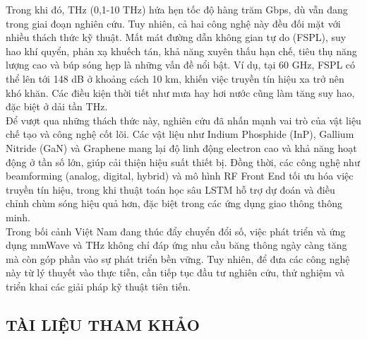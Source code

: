 \documentclass[a4paper,13pt]{article}
\begin{document}
Trong khi đó, THz (0,1-10 THz) hứa hẹn tốc độ hàng trăm Gbps, dù vẫn đang trong giai đoạn nghiên cứu.
Tuy nhiên, cả hai công nghệ này đều đối mặt với nhiều thách thức kỹ thuật. Mất mát đường dẫn không gian tự do (FSPL), suy hao khí quyển, phản xạ khuếch tán, khả năng xuyên thấu hạn chế, tiêu thụ năng lượng cao và búp sóng hẹp là những vấn đề nổi bật. Ví dụ, tại 60 GHz, FSPL có thể lên tới 148 dB ở khoảng cách 10 km, khiến việc truyền tín hiệu xa trở nên khó khăn. Các điều kiện thời tiết như mưa hay hơi nước cũng làm tăng suy hao, đặc biệt ở dải tần THz.\\

Để vượt qua những thách thức này, nghiên cứu đã nhấn mạnh vai trò của vật liệu chế tạo và công nghệ cốt lõi. Các vật liệu như Indium Phosphide (InP), Gallium Nitride (GaN) và Graphene mang lại độ linh động electron cao và khả năng hoạt động ở tần số lớn, giúp cải thiện hiệu suất thiết bị. Đồng thời, các công nghệ như beamforming (analog, digital, hybrid) và mô hình RF Front End tối ưu hóa việc truyền tín hiệu, trong khi thuật toán học sâu LSTM hỗ trợ dự đoán và điều chỉnh chùm sóng hiệu quả hơn, đặc biệt trong các ứng dụng giao thông thông minh.\\

Trong bối cảnh Việt Nam đang thúc đẩy chuyển đổi số, việc phát triển và ứng dụng mmWave và THz không chỉ đáp ứng nhu cầu băng thông ngày càng tăng mà còn góp phần vào sự phát triển bền vững. Tuy nhiên, để đưa các công nghệ này từ lý thuyết vào thực tiễn, cần tiếp tục đầu tư nghiên cứu, thử nghiệm và triển khai các giải pháp kỹ thuật tiên tiến.



\clearpage
\begin{center}
    \section{TÀI LIỆU THAM KHẢO}
\end{center}

\printbibliography
\end{document}
